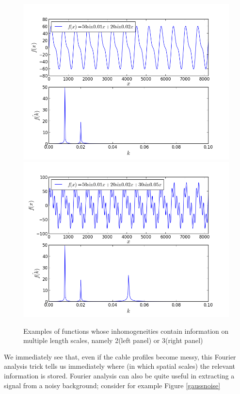 \documentclass[11pt, a4paper,oneside,openright]{book}
\numberwithin{equation}{section}
\begin{document}
\begin{figure}
\begin{center}
\includegraphics[scale=0.4]{Fourier/2component.png}
\includegraphics[scale=0.4]{Fourier/3component.png}
\label{}
\end{center}
\caption{Examples of functions whose inhomogeneities contain information on multiple length scales, namely 2(left panel) or 3(right panel)}
\label{fourier23d}
\end{figure}
We immediately see that, even if the cable profiles become messy, this Fourier analysis trick tells us immediately where (in which spatial scales) the relevant information is stored. Fourier analysis can also be quite useful in extracting a signal from a noisy background; consider for example Figure \ref{gaussnoise}
\end{document}
